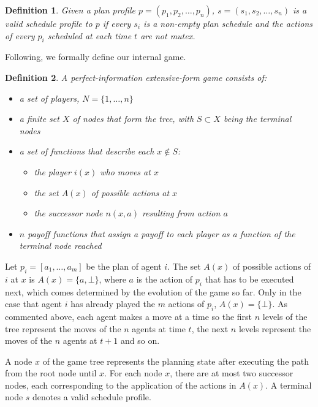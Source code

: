 \documentclass[letterpaper]{article}
\newtheorem{definition}{Definition}
\begin{document}
\begin{definition} Given a plan profile $p=(p_1, p_2, \ldots, p_n)$, $s=(s_1, s_2, \ldots, s_n)$ is a valid schedule profile to $p$
if every $s_i$ is a non-empty plan schedule and the actions of every $p_i$ scheduled at each time $t$ are not mutex.
\end{definition}

Following, we formally define our internal game.



\begin{definition} A perfect-information extensive-form game consists of:
\begin{itemize}
\item a set of players, $N=\{1, \ldots, n\}$
\item a finite set $X$ of nodes that form the tree, with $S \subset X$ being the terminal nodes
\item a set of functions that describe each $x \not\in S$:
\begin{itemize}
\item the player $i(x)$ who moves at $x$
\item the set $A(x)$ of possible actions at $x$
\item the successor node $n(x,a)$ resulting from action $a$
\end{itemize}
\item $n$ payoff functions that assign a payoff to each player as a function of the terminal node reached
\end{itemize}
\end{definition}

Let $p_i=[a_1,\ldots,a_m]$ be the plan of agent $i$. The set $A(x)$ of possible actions of $i$ at $x$ is $A(x)=\{a, \bot\}$, where
$a$ is the action of $p_i$ that has to be executed next, which comes determined by the evolution of the game so far. Only in the case that agent $i$ has already played the $m$ actions of $p_i$, $A(x)=\{\bot\}$. As commented above, each agent makes a move at a time so the first $n$ levels of the tree represent the moves of the $n$ agents at time $t$, the next $n$ levels represent the moves of the $n$ agents at $t+1$ and so on.

A node $x$ of the game tree represents the planning state after executing the path from the root node until $x$. For each node $x$,  there are at most two successor nodes, each corresponding to the application of the actions in $A(x)$. A terminal node $s$ denotes a valid schedule profile.
\end{document}
